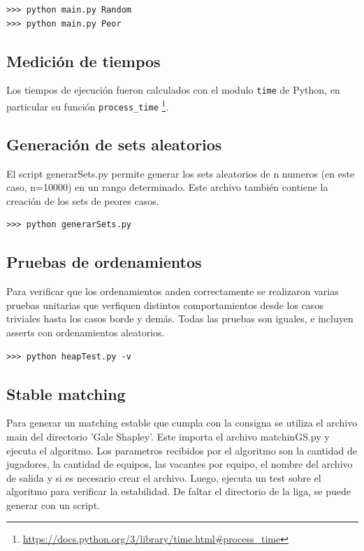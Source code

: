 \documentclass[article,a4paper]{article}
\begin{document}
\begin{verbatim}
>>> python main.py Random
>>> python main.py Peor
\end{verbatim}

\subsection{Medición de tiempos}
 Los tiempos de ejecución fueron calculados con el modulo \texttt{time} de Python, en particular su función \texttt{process\_time} \footnote{\url{https://docs.python.org/3/library/time.html\#process\_time}}.

\subsection{Generación de sets aleatorios}

El script generarSets.py permite generar los sets aleatorios de n numeros (en este caso, n=10000) en un rango determinado. Este archivo también contiene la creación de los sets de peores casos.

\begin{verbatim}
>>> python generarSets.py
\end{verbatim}

\subsection{Pruebas de ordenamientos}
Para verificar que los ordenamientos anden correctamente se realizaron varias pruebas unitarias que verfiquen distintos comportamientos desde los casos triviales hasta los casos borde y demás. Todas las pruebas son iguales, e incluyen asserts con ordenamientos aleatorios.

\begin{verbatim}
>>> python heapTest.py -v
\end{verbatim}

\subsection{Stable matching}
Para generar un matching estable que cumpla con la consigna se utiliza el archivo main del directorio 'Gale Shapley'. Este importa el archivo matchinGS.py y ejecuta el algoritmo. Los parametros recibidos por el algoritmo son la cantidad de jugadores, la cantidad de equipos, las vacantes por equipo, el nombre del archivo de salida y si es necesario crear el archivo. Luego, ejecuta un test sobre el algoritmo para verificar la estabilidad. De faltar el directorio de la liga, se puede generar con un script.
\end{document}
